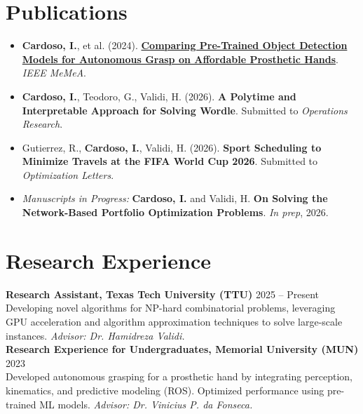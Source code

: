 \documentclass[letterpaper,10pt]{article}
\newcommand{\dategray}[1]{\textcolor{textgray}{#1}}
\begin{document}
\section{Publications}
\begin{itemize}[leftmargin=14pt, nosep, topsep=2pt, itemsep=2pt]
    \item \textbf{Cardoso, I.}, et al. (2024). \href{https://ieeexplore.ieee.org/document/10596873}{\textbf{Comparing Pre-Trained Object Detection Models for Autonomous Grasp on Affordable Prosthetic Hands}}. \textit{IEEE MeMeA}.
    \item \textbf{Cardoso, I.}, Teodoro, G., Validi, H. (2026). \textbf{A Polytime and Interpretable Approach for Solving Wordle}. Submitted to \textit{Operations Research}.
    \item Gutierrez, R., \textbf{Cardoso, I.}, Validi, H. (2026). \textbf{Sport Scheduling to Minimize Travels at the FIFA World Cup 2026}. Submitted to \textit{Optimization Letters}.
    \item \textit{Manuscripts in Progress:} \textbf{Cardoso, I.} and Validi, H. \textbf{On Solving the Network-Based Portfolio Optimization Problems}. \textit{In prep}, 2026.
\end{itemize}

\section{Research Experience}
\textbf{Research Assistant, Texas Tech University (TTU)} \hfill \dategray{2025 – Present} \\
Developing novel algorithms for NP-hard combinatorial problems, leveraging GPU acceleration and algorithm approximation techniques to solve large-scale instances. \textit{Advisor: Dr. Hamidreza Validi.} \\[3pt]
\textbf{Research Experience for Undergraduates, Memorial University (MUN)} \hfill \dategray{2023} \\
Developed autonomous grasping for a prosthetic hand by integrating perception, kinematics, and predictive modeling (ROS). Optimized performance using pre-trained ML models. \textit{Advisor: Dr. Vinicius P. da Fonseca.}

\end{document}
